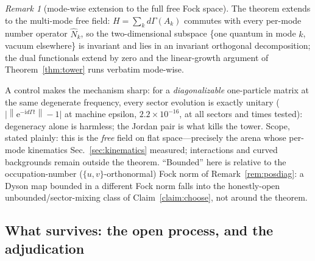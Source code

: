 \documentclass[11pt]{article}
\theoremstyle{definition}
\theoremstyle{remark}
\newtheorem{remark}[theorem]{Remark}
\newcommand{\ii}{\mathrm{i}}
\newcommand{\ee}{\mathrm{e}}
\newcommand{\norm}[1]{\left\lVert #1 \right\rVert}
\begin{document}
\begin{remark}[mode-wise extension to the full free Fock space]
\label{rem:modewise}
The theorem extends to the multi-mode free field:
$H=\sum_{k}d\Gamma(A_{k})$ commutes with every per-mode number
operator $\hat N_{k}$, so the two-dimensional subspace \{one quantum
in mode $k$, vacuum elsewhere\} is invariant and lies in an invariant
orthogonal decomposition; the dual functionals extend by zero and the
linear-growth argument of Theorem~\ref{thm:tower} runs verbatim
mode-wise.
\end{remark}

A control makes the mechanism sharp: for a \emph{diagonalizable}
one-particle matrix at the same degenerate frequency, every sector
evolution is exactly unitary ($\bigl|\norm{\ee^{-\ii d\Gamma
t}}-1\bigr|$ at machine epsilon, $2.2\times10^{-16}$, at all
sectors and times tested):
degeneracy alone is harmless; the Jordan pair is what kills the
tower. Scope, stated plainly: this is the \emph{free} field on flat
space---precisely the arena whose per-mode kinematics
Sec.~\ref{sec:kinematics} measured; interactions and curved
backgrounds remain outside the theorem. ``Bounded'' here is relative to
the occupation-number ($\{u,v\}$-orthonormal) Fock norm of
Remark~\ref{rem:posdiag}: a Dyson map bounded in a different Fock norm
falls into the honestly-open unbounded/sector-mixing class of
Claim~\ref{claim:choose}, not around the theorem.

\subsection{What survives: the open process, and the adjudication}
\end{document}
